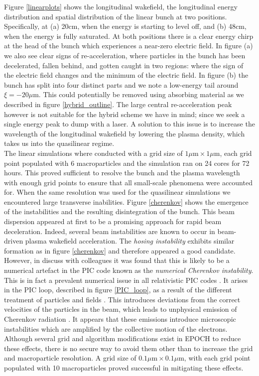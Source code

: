 \indent Figure \ref{linearplots} shows the longitudinal wakefield, the longitudinal energy distribution and spatial distribution of the linear bunch at two positions. Specifically, at (a) 20cm, when the energy is starting to level off, and (b) 48cm, when the energy is fully saturated. At both positions there is a clear energy chirp at the head of the bunch which experiences a near-zero electric field. In figure (a) we also see clear signs of re-acceleration, where particles in the bunch has been decelerated, fallen behind, and gotten caught in two regions: where the sign of the electric field changes and the minimum of the electric field. In figure (b) the bunch has split into four distinct parts and we note a low-energy tail around $\xi=-20 \mu\text{m}$. This could potentially be removed using absorbing material as we described in figure \ref{hybrid_outline}. The large central re-acceleration peak however is not suitable for the hybrid scheme we have in mind; since we seek a single energy peak to dump with a laser. A solution to this issue is to increase the wavelength of the longitudinal wakefield by lowering the plasma density, which takes us into the quasilinear regime. \\
\indent The linear simulations where conducted with a grid size of $1 \mu\text{m}\times 1\mu\text{m}$, each grid point populated with 6 macroparticles and the simulation ran on 24 cores for 72 hours. This proved sufficient to resolve the bunch and the plasma wavelength with enough grid points to ensure that all small-scale phenomena were accounted for. When the same resolution was used for the quasilinear simulations we encountered large transverse inabilities. Figure \ref{cherenkov} shows the emergence of the instabilities and the resulting disintegration of the bunch. This beam dispersion appeared at first to be a promising approach for rapid beam deceleration. Indeed, several beam instabilities are known to occur in beam-driven plasma wakefield acceleration. The \textit{hosing instability} \cite{Huang2007} exhibits similar formation as in figure \ref{cherenkov} and therefore appeared a good candidate. However, in discuss with colleagues it was found that this is likely to be a numerical artefact in the PIC code known as the \textit{numerical Cherenkov instability}. This is in fact a prevalent numerical issue in all relativistic PIC codes \cite{Godfrey2018}. It arises in the PIC loop, described in figure \ref{PIC_loop}, as a result of the different treatment of particles and fields  \cite{Blinne}. This introduces deviations from the correct velocities of the particles in the beam, which  leads to unphysical emission of Cherenkov radiation \cite{Godfrey2018}. It appears that these emissions introduce microscopic instabilities which are amplified by the collective motion of the electrons. Although several grid and algorithm modifications exist in EPOCH to reduce these effects, there is no secure way to avoid them other than to increase the grid and macroparticle resolution. A grid size of $0.1 \mu\text{m}\times 0.1\mu\text{m}$, with each grid point populated with 10 macroparticles proved successful in mitigating these effects. 
